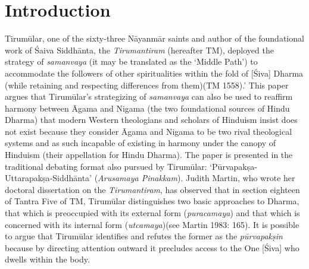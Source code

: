 \section*{Introduction}

Tirumūlar, one of the sixty-three Nāyanmār saints and author of the foundational work of Śaiva Siddhānta, the \textit{Tirumantiram} (hereafter TM), deployed the strategy of \textit{samanvaya} (it may be translated as the ‘Middle Path’) to accommodate the followers of other spiritualities within the fold of [Śiva] Dharma (while retaining and respecting differences from them)(TM 1558).’ This paper argues that Tirumūlar’s strategizing of \textit{samanvaya} can also be used to reaffirm harmony between Āgama and Nigama (the two foundational sources of Hindu Dharma) that modern Western theologians and scholars of Hinduism insist does not exist because they consider Āgama and Nigama to be two rival theological systems and as such incapable of existing in harmony under the canopy of Hinduism (their appellation for Hindu Dharma). The paper is presented in the traditional debating format also pursued by Tirumūlar: ‘Pūrvapakṣa-Uttarapakṣa-Siddhānta’ (\textit{Arusamaya Pinakkam}). Judith Martin, who wrote her doctoral dissertation on the \textit{Tirumantiram}, has observed that in section eighteen of Tantra Five of TM, Tirumūlar distinguishes two basic approaches to Dharma, that which is preoccupied with its external form (\textit{puracamaya}) and that which is concerned with its internal form (\textit{utcamaya})(see Martin 1983: 165). It is possible to argue that Tirumūlar identifies and refutes the former as the \textit{pūrvapakṣin} because by directing attention outward it precludes access to the One [Śiva] who dwells within the body.

